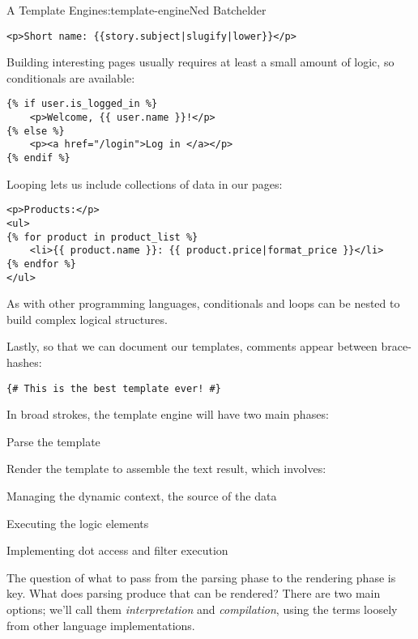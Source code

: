 \begin{aosachapter}{A Template Engine}{s:template-engine}{Ned Batchelder}
\begin{verbatim}
<p>Short name: {{story.subject|slugify|lower}}</p>
\end{verbatim}

Building interesting pages usually requires at least a small amount of
logic, so conditionals are available:

\begin{verbatim}
{% if user.is_logged_in %}
    <p>Welcome, {{ user.name }}!</p>
{% else %}
    <p><a href="/login">Log in </a></p>
{% endif %}
\end{verbatim}

Looping lets us include collections of data in our pages:

\begin{verbatim}
<p>Products:</p>
<ul>
{% for product in product_list %}
    <li>{{ product.name }}: {{ product.price|format_price }}</li>
{% endfor %}
</ul>
\end{verbatim}

As with other programming languages, conditionals and loops can be
nested to build complex logical structures.

Lastly, so that we can document our templates, comments appear between
brace-hashes:

\begin{verbatim}
{# This is the best template ever! #}
\end{verbatim}

\label{implementation-approaches}

In broad strokes, the template engine will have two main phases:

\begin{aosaitemize}

\item
  Parse the template
\item
  Render the template to assemble the text result, which involves:

  \begin{aosaitemize}
  
  \item
    Managing the dynamic context, the source of the data
  \item
    Executing the logic elements
  \item
    Implementing dot access and filter execution
  \end{aosaitemize}
\end{aosaitemize}

The question of what to pass from the parsing phase to the rendering
phase is key. What does parsing produce that can be rendered? There are
two main options; we'll call them \emph{interpretation} and
\emph{compilation}, using the terms loosely from other language
implementations.


\end{aosachapter}
